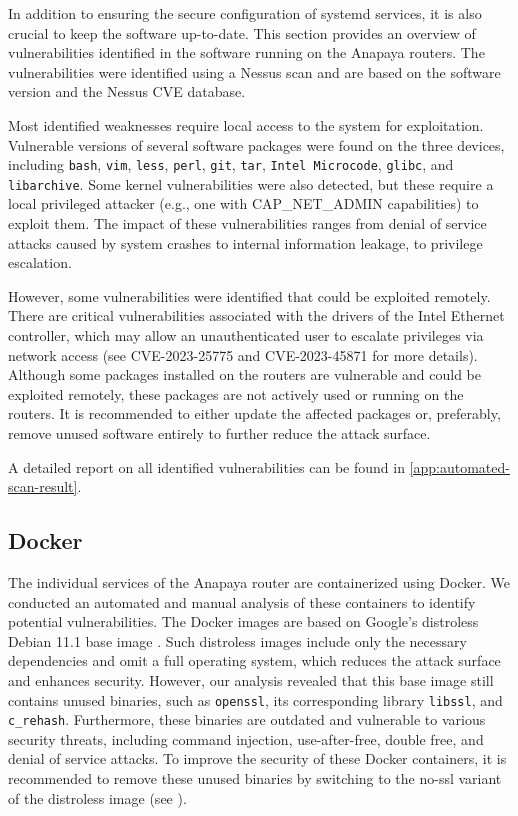 In addition to ensuring the secure configuration of systemd services, it is also crucial to keep the software up-to-date.
This section provides an overview of vulnerabilities identified in the software running on the Anapaya routers.
The vulnerabilities were identified using a Nessus scan and are based on the software version and the Nessus CVE database.

Most identified weaknesses require local access to the system for exploitation.
Vulnerable versions of several software packages were found on the three devices, including \texttt{bash}, \texttt{vim}, \texttt{less}, \texttt{perl}, \texttt{git}, \texttt{tar}, \texttt{Intel Microcode}, \texttt{glibc}, and \texttt{libarchive}.
Some kernel vulnerabilities were also detected, but these require a local privileged attacker (e.g., one with CAP\_NET\_ADMIN capabilities) to exploit them.
The impact of these vulnerabilities ranges from denial of service attacks caused by system crashes to internal information leakage, to privilege escalation.

However, some vulnerabilities were identified that could be exploited remotely.
There are critical vulnerabilities associated with the drivers of the Intel Ethernet controller, which may allow an unauthenticated user to escalate privileges via network access (see CVE-2023-25775 and CVE-2023-45871 for more details).
Although some packages installed on the routers are vulnerable and could be exploited remotely, these packages are not actively used or running on the routers.
It is recommended to either update the affected packages or, preferably, remove unused software entirely to further reduce the attack surface.

A detailed report on all identified vulnerabilities can be found in \cref{app:automated-scan-result}.



\subsection{Docker}

The individual services of the Anapaya router are containerized using Docker.
We conducted an automated and manual analysis of these containers to identify potential vulnerabilities.
The Docker images are based on Google's distroless Debian 11.1 base image \cite{githubGitHubGoogleContainerToolsdistroless}.
Such distroless images include only the necessary dependencies and omit a full operating system, which reduces the attack surface and enhances security.
However, our analysis revealed that this base image still contains unused binaries, such as \texttt{openssl}, its corresponding library \texttt{libssl}, and \texttt{c\_rehash}.
Furthermore, these binaries are outdated and vulnerable to various security threats, including command injection, use-after-free, double free, and denial of service attacks.
To improve the security of these Docker containers, it is recommended to remove these unused binaries by switching to the no-ssl variant of the distroless image (see \cite{githubGitHubGoogleContainerToolsdistroless}).

